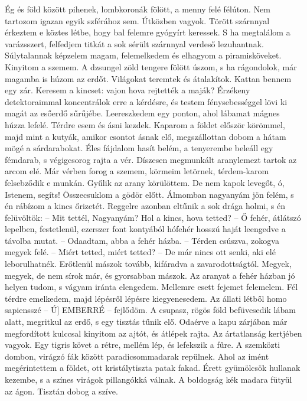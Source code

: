 \bigskip
\begin{itshape}
Ég és föld között pihenek, lombkoronák fölött, a menny felé félúton.
Nem tartozom igazan egyik szférához sem. Útközben vagyok. Törött
szárnnyal érkeztem e köztes létbe, hogy bal felemre gyógyírt keressek. S ha
megtalálom a varázsszert, felfedjem titkát a sok sérült szárnnyal verdeső
lezuhantnak. Súlytalannak képzelem magam, felemelkedem és elhagyom
a piramisköveket. Kinyitom a szemem. A dzsungel zöld tengere fölött
úszom, s ha rágondolok, már magamba is húzom az erdőt. Világokat teremtek
és átalakítok. Kattan bennem egy zár. Keresem a kincset: vajon
hova rejtették a maják? Érzékeny detektoraimmal koncentrálok erre a
kérdésre, és testem fénysebességgel lövi ki magát az esőerdő sűrűjébe.
Leereszkedem egy ponton, ahol lábamat mágnes húzza lefelé. Térdre esem
és ásni kezdek. Kaparom a földet először körömmel, majd mint a kutyák,
amikor csontot ásnak elő, megszállottan dobom a hátam mögé a sárdarabokat.
Éles fájdalom hasít belém, a tenyerembe beleáll egy fémdarab, s végigcsorog
rajta a vér. Díszesen megmunkált aranylemezt tartok az arcom elé.
Már vérben forog a szemem, körmeim letörnek, térdem-karom felsebződik
e munkán. Gyűlik az arany körülöttem. De nem kapok levegőt, ó, Istenem,
segíts! Összecsuklom a gödör előtt. Álmomban nagyanyám jön felém, s én
rábízom a kincs őrizetét. Reggelre azonban eltűnik a sok drága holmi, s én
felüvöltök: -- Mit tettél, Nagyanyám? Hol a kincs, hova tetted? -- Ő fehér,
átlátszó lepelben, festetlenül, ezerszer font kontyából hófehér hosszú haját
leengedve a távolba mutat. -- Odaadtam, abba a fehér házba. -- Térden
csúszva, zokogva megyek felé. -- Miért tetted, miért tetted? -- De már nincs
ott senki, aki elé leborulhatnék. Erőtlenül mászok tovább, kifáradva a
zavarodottságtól. Megyek, megyek, de nem sírok már, és gyorsabban mászok.
Az aranyat a fehér házban jó helyen tudom, s vágyam iránta elengedem.
Mellemre esett fejemet felemelem. Fél térdre emelkedem, majd lépésről
lépésre kiegyenesedem. Az állati létből homo sapiensszé -- Ú] EMBERRÉ --
fejlődöm. A csupasz, rögös föld befüvesedik lábam alatt, megritkul az erdő,
s egy tisztás tűnik elő. Odaérve a kapu zárjában már megfordított kulccsal
kinyitom az ajtót, és átlépek rajta. Az ártatlanság kertjében vagyok. Egy
tigris követ a rétre, mellém lép, és lefekszik a fűre. A szemközti dombon,
virágzó fák között paradicsommadarak repülnek. Ahol az imént megérintettem
a földet, ott kristálytiszta patak fakad. Érett gyümölcsök hullanak
kezembe, s a színes virágok pillangókká válnak. A boldogság kék madara
fütyül az ágon. Tisztán dobog a szíve.


\end{itshape}
